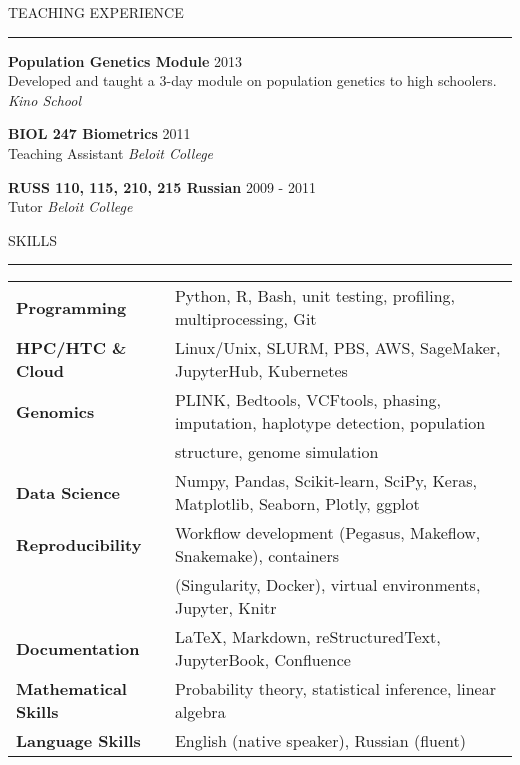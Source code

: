 \documentclass{resume} %
\renewenvironment{rSection}[1]{
\sectionskip
\textcolor{RoyalPurple}{\MakeUppercase{#1}}
\sectionlineskip
\hrule
\begin{list}{}{
\setlength{\leftmargin}{1.5em}
}
\item[]
}{
\end{list}
}
\begin{document}
\begin{rSection}{Teaching Experience}
    {\bf Population Genetics Module} \hfill 2013\\
    Developed and taught a 3-day module on population genetics to high schoolers. \hspace*{\fill} {\em Kino School}

    {\bf BIOL 247 Biometrics} \hfill 2011\\ 
    Teaching Assistant \hspace*{\fill} {\em Beloit College}

    {\bf RUSS 110, 115, 210, 215 Russian} \hfill 2009 - 2011 \\ 
    Tutor \hspace*{\fill} {\em Beloit College}

\end{rSection}


\begin{rSection}{Skills}

    \begin{tabular}{ @{} >{\bfseries}l @{\hspace{6ex}} l }
    Programming & Python, R, Bash, unit testing, profiling, multiprocessing, Git\\
    HPC/HTC \& Cloud & Linux/Unix, SLURM, PBS, AWS, SageMaker, JupyterHub, Kubernetes  \\
    Genomics & PLINK, Bedtools, VCFtools, phasing, imputation, haplotype detection, population \\ & structure, genome simulation\\
    Data Science & Numpy, Pandas, Scikit-learn, SciPy, Keras, Matplotlib, Seaborn, Plotly, ggplot \\
    Reproducibility & Workflow development (Pegasus, Makeflow, Snakemake), containers \\ & (Singularity, Docker), virtual environments, Jupyter, Knitr \\
    Documentation & \LaTeX, Markdown, reStructuredText, JupyterBook, Confluence \\
    Mathematical Skills & Probability theory, statistical inference, linear algebra \\
    Language Skills & English (native speaker), Russian (fluent)
    \end{tabular}
    
\end{rSection}
\end{document}
